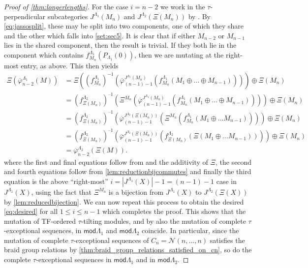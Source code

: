 \documentclass[11pt]{amsart}
\newcommand{\mods}{\mathsf{mod}}
\theoremstyle{definition}
\begin{document}
\begin{proof}[Proof of \cref{thm:longerlengths}]
    For the case $i = n-2$ we work in the $\tau$-perpendicular subcategories $J^{\Lambda_1}(M_n)$ and $J^{\Lambda_2}(\Xi(M_n))$ by \cite[Prop. 3.32]{bkt}. By \cref{eq:jassosplit}, these may be split into two components, one of which they share and the other which falls into \cref{set:sec5}. It is clear that if either $M_{n-2}$ or $M_{n-1}$ lies in the shared component, then the result is trivial. If they both lie in the component which contains $f_{M_n}^{\Lambda_1}(P_{\Lambda_1}(0))$, then we are mutating at the right-most entry, as above. This then yields
    \begin{align*}
       \Xi(\overline{\varphi}_{n-2}^{\Lambda_1}(M))
       &=  \Xi( ( f_{M_n}^{\Lambda_1})^{-1} (\overline{\varphi}^{J^{\Lambda_1}(M_n)}_{(n-1)-1} (f_{M_n}^{\Lambda_1}(M_1 \oplus \dots \oplus M_{n-1})))) \oplus \Xi(M_n) \\
       & = (f_{\Xi(M_n)}^{\Lambda_2})^{–1} ( \Xi^{M_n}(  \overline{\varphi}^{J^{\Lambda_1}(M_n)}_{(n-1)-1}(f_{M_n}^{\Lambda_1}(M_1 \oplus \dots \oplus M_{n-1})))) \oplus \Xi(M_n) \\
       &= (f_{\Xi(M_n)}^{\Lambda_2})^{–1}  ( \overline{\varphi}^{J^{\Lambda_2}(\Xi(M_n))}_{(n-1)-1}(\Xi^{M_n}(f_{M_n}^{\Lambda_1}(M_1 \oplus \dots M_{n-1})))) \oplus \Xi(M_n) \\
       &= (f_{\Xi(M_n)}^{\Lambda_2})^{–1}  ( \overline{\varphi}^{J^{\Lambda_2}(\Xi(M_n))}_{(n-1)-1}(f_{\Xi(M_n)}^{\Lambda_2}(\Xi(M_1 \oplus \dots M_{n-1})))) \oplus \Xi(M_n) \\
       &= \overline{\varphi}_{n-2}^{\Lambda_2}(\Xi(M)).
    \end{align*}
    where the first and final equations follow from \cite[Prop. 3.32]{bkt} and the additivity of $\Xi$, the second and fourth equations follow from \cref{lem:reductionbijcommutes} and finally the third equation is the above ``right-most'' $i = |J^{\Lambda_1}(X)|-1 = (n-1)-1$ case in $J^{\Lambda_1}(X)$, using the fact that $\Xi^{M_n}$ is a bijection from $J^{\Lambda_1}(X)$ to $J^{\Lambda_2}(\Xi(X))$ by \cref{lem:reducedbijection}. We can now repeat this process to obtain the desired \cref{eq:desired} for all $1 \leq i \leq n-1$ which completes the proof. This shows that the mutation of TF-ordered $\tau$-tilting modules, and by \cite[Def. 3.28, Prop. 3.32]{bkt} also the mutation of complete $\tau$-exceptional sequences, in $\mods \Lambda_1$ and $\mods \Lambda_2$ coincide. In particular, since the mutation of complete $\tau$-exceptional sequences of $C_n = \mathcal{N}(n,\dots, n)$ satisfies the braid group relations by \cref{thm:braid_group_relations_satisfied_on_cn}, so do the complete $\tau$-exceptional sequences in $\mods \Lambda_1$ and in $\mods \Lambda_2$.
\end{proof}
\end{document}
